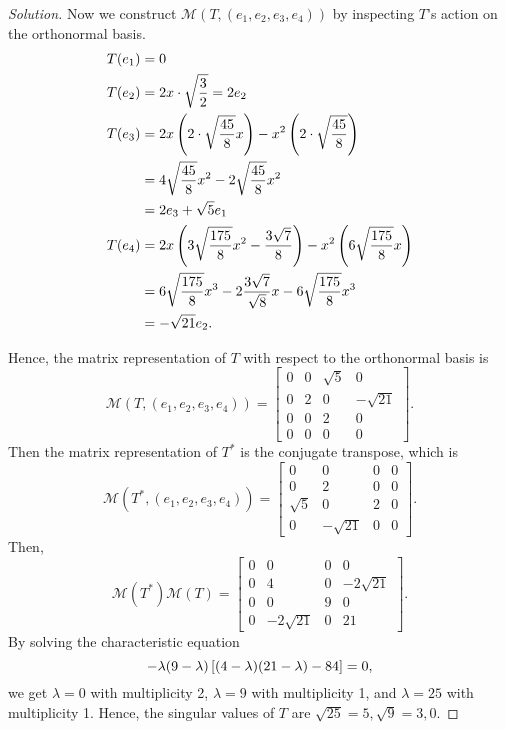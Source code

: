 \documentclass{article}
\begin{document}
\begin{proof}[Solution]
    Now we construct $\mathcal{M}(T,(e_1,e_2,e_3,e_4))$ by inspecting $T$'s action on the orthonormal
    basis.
    \begin{align*}
        T(e_1) & = 0 \\
        T(e_2) & = 2x\cdot\sqrt{\frac{3}{2}} = 2e_2 \\
        T(e_3) & = 2x\left(2\cdot\sqrt{\frac{45}{8}}x\right) - x^2\left(2\cdot\sqrt{\frac{45}{8}}\right) \\
        & = 4\sqrt{\frac{45}{8}}x^2 - 2\sqrt{\frac{45}{8}}x^2 \\
        & = 2e_3 + \sqrt{5}e_1 \\
        T(e_4) & = 2x\left(3\sqrt{\frac{175}{8}}x^2-\frac{3\sqrt{7}}{8}\right) - x^2\left(6\sqrt{\frac{175}{8}}x\right) \\
        & = 6\sqrt{\frac{175}{8}}x^3 - 2\frac{3\sqrt{7}}{\sqrt{8}}x - 6\sqrt{\frac{175}{8}}x^3 \\
        & = -\sqrt{21}e_2.
    \end{align*}

    Hence, the matrix representation of $T$ with respect to the orthonormal basis is
    \[
        \mathcal{M}(T,(e_1,e_2,e_3,e_4)) = \begin{bmatrix}
            0 & 0 & \sqrt{5} & 0 \\
            0 & 2 & 0 & -\sqrt{21} \\
            0 & 0 & 2 & 0 \\
            0 & 0 & 0 & 0
        \end{bmatrix}.
    \]
    Then the matrix representation of $T^*$ is the conjugate transpose, which is 
    \[
        \mathcal{M}(T^*,(e_1,e_2,e_3,e_4)) = \begin{bmatrix}
            0 & 0 & 0 & 0 \\
            0 & 2 & 0 & 0 \\
            \sqrt{5} & 0 & 2 & 0 \\
            0 & -\sqrt{21} & 0 & 0
        \end{bmatrix}.
    \]
    Then, 
    \[
      \mathcal{M}(T^*)\mathcal{M}(T) = \begin{bmatrix}
          0 & 0 & 0 & 0 \\
          0 & 4 & 0 & -2\sqrt{21} \\
          0 & 0 & 9 & 0 \\
          0 & -2\sqrt{21} & 0 & 21
        \end{bmatrix}.
    \]
    By solving the characteristic equation 
    \[
        -\lambda(9-\lambda)\left[(4-\lambda)(21-\lambda)-84\right] = 0,
    \]
    we get $\lambda = 0$ with multiplicity 2, $\lambda = 9$ with multiplicity 1, and $\lambda = 25$
    with multiplicity 1. Hence, the singular values of $T$ are $\sqrt{25} = 5, \sqrt{9} = 3, 0$.
\end{proof}
\end{document}
